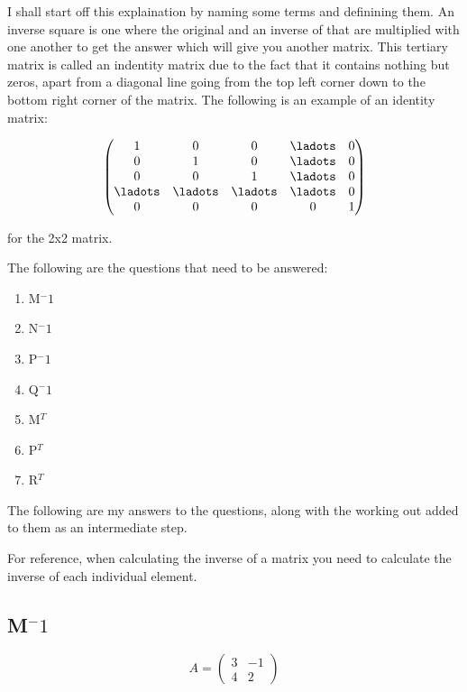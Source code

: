 \documentclass[a4paper,12pt]{article}
\begin{document}
        I shall start off this explaination by naming some terms and definining them. An inverse square is one where the original and an inverse of that are multiplied with one another to get the answer which will give you another matrix. This tertiary matrix is called an indentity matrix due to the fact that it contains nothing but zeros, apart from a diagonal line going from the top left corner down to the bottom right corner of the matrix. The following is an example of an identity matrix:

        \begin{equation}
          \begin{pmatrix}
            1 & 0 & 0 & \ladots & 0\\
            0 & 1 & 0 & \ladots & 0\\
            0 & 0 & 1 & \ladots & 0\\
            \ladots & \ladots & \ladots & \ladots & 0\\
            0 & 0 & 0 & 0 & 1
          \end{pmatrix}
        \end{equation}

        for the 2x2 matrix.



        The following are the questions that need to be answered:

        \begin{enumerate}
          \item M$^-1$
          \item N$^-1$
          \item P$^-1$
          \item Q$^-1$
          \item M$^T$
          \item P$^T$
          \item R$^T$
        \end{enumerate}

        The following are my answers to the questions, along with the working out added to them as an intermediate step.

        For reference, when calculating the inverse of a matrix you need to calculate the inverse of each individual element.

        \subsection{M$^-1$}
        \begin{equation}
          A =
          \begin{pmatrix}
            3 & -1\\
            4 &  2
          \end{pmatrix}
        \end{equation}
\end{document}
